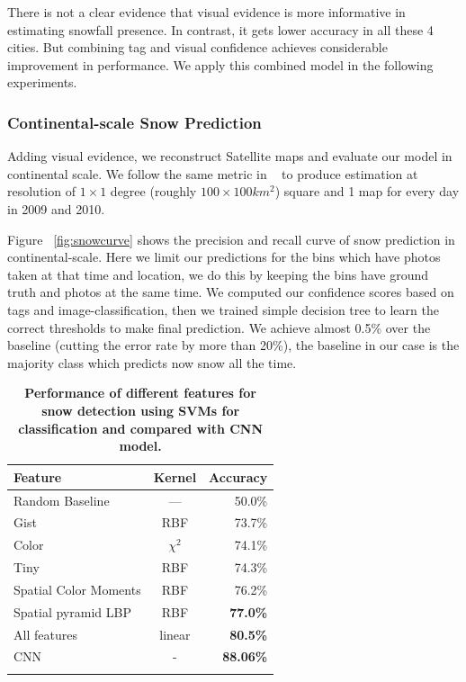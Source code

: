 There is not a clear evidence that visual evidence is more informative in estimating snowfall 
presence. In contrast, it gets lower accuracy in all these 4 cities. But combining tag and visual 
confidence achieves considerable improvement in performance. We apply this combined model 
in the following experiments.

\subsubsection{Continental-scale Snow Prediction}
Adding visual evidence, we reconstruct Satellite maps and 
evaluate our model in continental scale. We follow the same metric in ~\cite{ecology2012www} to produce 
estimation at resolution of $1 \times 1$ degree (roughly $100 \times 100 km^2$) square and 1 map for 
every day in 2009 and 2010.

Figure ~\ref{fig:snowcurve} shows the precision and recall curve of snow prediction in 
continental-scale.
Here we limit our predictions for the bins which have photos taken at that 
time and location, we do this by keeping the bins have ground truth and photos at the same time. 
We computed our confidence scores based on tags and image-classification, then we trained 
simple decision tree to learn the correct thresholds to make final prediction. We achieve 
almost 0.5\% over the baseline (cutting the error rate by more than 20\%), the baseline in 
our case is the majority class which predicts now snow all the time. 



\begin{table}\centering
\caption{\textbf{Performance of different features for snow detection using SVMs for classification and compared with CNN model.}}
\label{tab:snow}
\tiny
\begin{tabular}{@{}lcr@{}}\toprule
Feature & Kernel & Accuracy\\\midrule
Random Baseline & --- & 50.0\%\\
Gist & RBF & 73.7\%\\
Color  & $\chi^2$ & 74.1\%\\
Tiny & RBF & 74.3\%\\
Spatial Color Moments & RBF & 76.2\%\\
Spatial pyramid LBP & RBF &\textbf{77.0\%}\\\midrule
All features  & linear & \textbf{80.5\%}\\
CNN& -& \textbf{88.06\%}\\
\bottomrule\\
\end{tabular}
\end{table}


